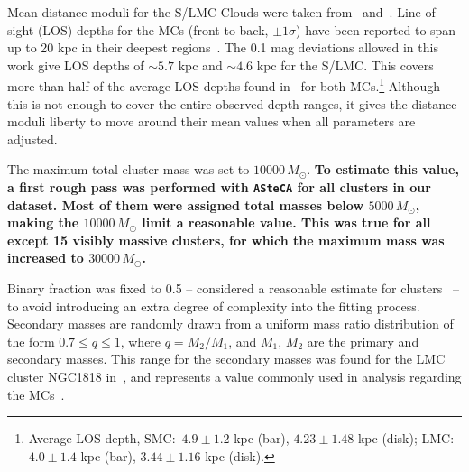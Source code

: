 \documentclass[referee]{aa}
\begin{document}
Mean distance moduli for the S/LMC Clouds were taken
from~\cite{de_Grijs_2015} and~\cite{de_Grijs_2014}.
%
Line of sight (LOS) depths for the MCs (front to back, $\pm1\sigma$) have been
reported to span up to 20 kpc in their deepest
regions~\citep{Subramanian_2009,Nidever_2013,Scowcroft_2015}.
%
The 0.1 mag deviations allowed in this work give LOS depths of ${\sim}5.7$ kpc
and ${\sim}4.6$ kpc for the S/LMC\@. This covers more than half of the average
LOS depths found in~\cite{Subramanian_2009} for both MCs.\footnote
{Average LOS depth, SMC:\ $4.9\pm1.2$ kpc (bar), $4.23\pm1.48$ kpc 
(disk); LMC:\ $4.0\pm1.4$ kpc (bar), $3.44\pm1.16$ kpc (disk).}
Although this is not enough to cover the entire observed depth ranges, it gives
the distance moduli liberty to move around their mean values when all parameters
are adjusted.

The maximum total cluster mass was set to $10000\,M_{\odot}$.
%
\textbf{To estimate this value, a first rough pass was performed with
\texttt{ASteCA} for all clusters in our dataset. Most of them were assigned
total masses below $5000\,M_{\odot}$, making the $10000\,M_{\odot}$ limit a
reasonable value.
%
This was true for all except 15 visibly massive clusters, for which the
maximum mass was increased to $30000\,M_{\odot}$.}

Binary fraction was fixed to 0.5 -- considered a
reasonable estimate for clusters~\citep{von_Hippel_2005,Sollima_2010} -- to
avoid introducing an extra degree of complexity into the fitting process.
Secondary masses are randomly drawn from a uniform mass ratio distribution of
the form $0.7{\le}q{\le}1$, where $q{=}M_2/M_1$, and $M_1$, $M_2$ are the
primary and secondary masses. This range for the secondary masses was found for
the LMC cluster NGC1818 in~\cite{Elson_1998}, and represents a value
commonly used in analysis regarding the MCs~\citep[see][and references therein]
{Rubele_2011}.
\end{document}
